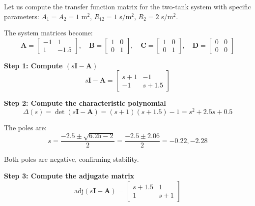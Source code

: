 \begin{example}
\label{ex:two_tank_tf}
Let us compute the transfer function matrix for the two-tank system with specific parameters: $A_1 = A_2 = 1$ m$^2$, $R_{12} = 1$ s/m$^2$, $R_2 = 2$ s/m$^2$.

The system matrices become:
\begin{equation}
\mathbf{A} = \begin{bmatrix} -1 & 1 \\ 1 & -1.5 \end{bmatrix}, \quad
\mathbf{B} = \begin{bmatrix} 1 & 0 \\ 0 & 1 \end{bmatrix}, \quad
\mathbf{C} = \begin{bmatrix} 1 & 0 \\ 0 & 1 \end{bmatrix}, \quad
\mathbf{D} = \begin{bmatrix} 0 & 0 \\ 0 & 0 \end{bmatrix}
\end{equation}

\textbf{Step 1: Compute $(s\mathbf{I} - \mathbf{A})$}
\begin{equation}
s\mathbf{I} - \mathbf{A} = \begin{bmatrix} s+1 & -1 \\ -1 & s+1.5 \end{bmatrix}
\end{equation}

\textbf{Step 2: Compute the characteristic polynomial}
\begin{equation}
\Delta(s) = \det(s\mathbf{I} - \mathbf{A}) = (s+1)(s+1.5) - 1 = s^2 + 2.5s + 0.5
\end{equation}

The poles are:
\begin{equation}
s = \frac{-2.5 \pm \sqrt{6.25 - 2}}{2} = \frac{-2.5 \pm 2.06}{2} = -0.22, -2.28
\end{equation}

Both poles are negative, confirming stability.

\textbf{Step 3: Compute the adjugate matrix}
\begin{equation}
\text{adj}(s\mathbf{I} - \mathbf{A}) = \begin{bmatrix} s+1.5 & 1 \\ 1 & s+1 \end{bmatrix}
\end{equation}


\end{example}
